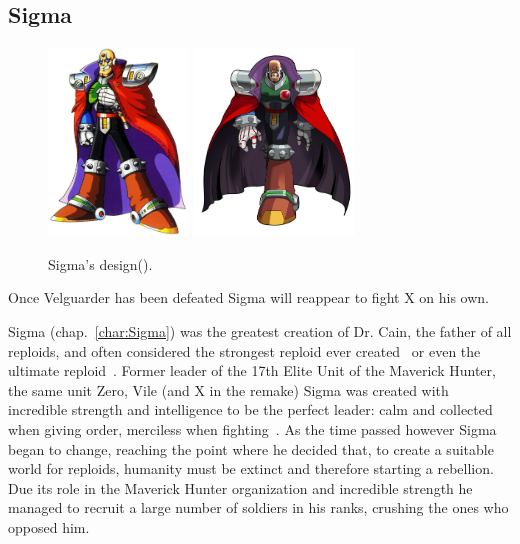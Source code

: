 \subsection{Sigma}\label{boss:Sigma_x1}
\begin{figure}[htp]
	\centering
	\includegraphics[height=5cm]{figures/X1/Sigma_stages/Sigma.jpg}
	\includegraphics[height=5cm]{figures/X1/Sigma_stages/MHXSigma.jpg}
	\caption{Sigma's design(\cite{book:MMX_Complete_art}).}
\end{figure}
Once Velguarder has been defeated Sigma will reappear to fight X on his own.

Sigma (chap.~\ref{char:Sigma}) was the greatest creation of Dr. Cain, the father of all reploids, and often considered the strongest reploid ever created~\cite{wayback:X_resources} or even the ultimate reploid~\cite{MHX:manual}. Former leader of the 17th Elite Unit of the Maverick Hunter, the same unit Zero, Vile (and X in the remake) Sigma was created with incredible strength and intelligence  to be the perfect leader: calm and collected when giving order, merciless when fighting~\cite{Xcoll1:Manual_X1}. As the time passed however Sigma began to change, reaching the point where he decided that, to create a suitable world for reploids, humanity must be extinct and therefore starting a rebellion. Due its role in the Maverick Hunter organization and incredible strength he managed to recruit a large number of soldiers in his ranks, crushing the ones who opposed him. 

